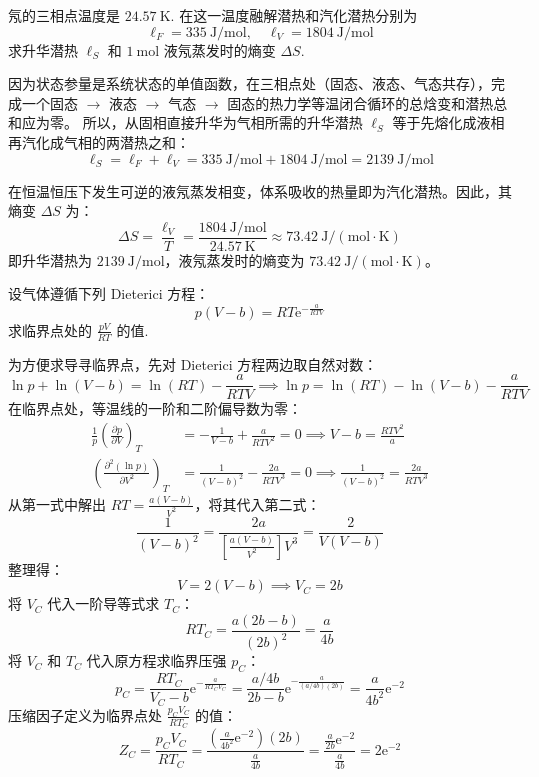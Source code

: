 \begin{exercise}\label{ex:14.4}
氖的三相点温度是 $24.57 \ \mathrm{K}$. 在这一温度融解潜热和汽化潜热分别为
$$ \ell_F = 335 \ \mathrm{J/mol}, \quad \ell_V = 1804 \ \mathrm{J/mol} $$
求升华潜热 $\ell_S$ 和 $1 \ \mathrm{mol}$ 液氖蒸发时的熵变 $\Delta S$.
\end{exercise}
\begin{solution}
因为状态参量是系统状态的单值函数，在三相点处（固态、液态、气态共存），完成一个固态 $\to$ 液态 $\to$ 气态 $\to$ 固态的热力学等温闭合循环的总焓变和潜热总和应为零。
所以，从固相直接升华为气相所需的升华潜热 $\ell_S$ 等于先熔化成液相再汽化成气相的两潜热之和：
$$ \ell_S = \ell_F + \ell_V = 335 \ \mathrm{J/mol} + 1804 \ \mathrm{J/mol} = 2139 \ \mathrm{J/mol} $$

在恒温恒压下发生可逆的液氖蒸发相变，体系吸收的热量即为汽化潜热。因此，其熵变 $\Delta S$ 为：
$$ \Delta S = \frac{\ell_V}{T} = \frac{1804 \ \mathrm{J/mol}}{24.57 \ \mathrm{K}} \approx 73.42 \ \mathrm{J/(mol \cdot K)} $$
即升华潜热为 $2139 \ \mathrm{J/mol}$，液氖蒸发时的熵变为 $73.42 \ \mathrm{J/(mol \cdot K)}$。
\end{solution}

\begin{exercise}\label{ex:14.5}
设气体遵循下列 Dieterici 方程：
$$ p(V-b) = RT\mathrm{e}^{-\frac{a}{RTV}} $$
求临界点处的 $\frac{pV}{RT}$ 的值.
\end{exercise}
\begin{solution}
为方便求导寻临界点，先对 Dieterici 方程两边取自然对数：
$$ \ln p + \ln(V - b) = \ln(RT) - \frac{a}{RTV} \implies \ln p = \ln(RT) - \ln(V - b) - \frac{a}{RTV} $$
在临界点处，等温线的一阶和二阶偏导数为零：
\begin{align*}
    \frac{1}{p} \left( \frac{\partial p}{\partial V} \right)_T &= - \frac{1}{V - b} + \frac{a}{RTV^2} = 0 \implies V - b = \frac{RTV^2}{a} \\
    \left( \frac{\partial^2 (\ln p)}{\partial V^2} \right)_T &= \frac{1}{(V - b)^2} - \frac{2a}{RTV^3} = 0 \implies \frac{1}{(V - b)^2} = \frac{2a}{RTV^3}
\end{align*}
从第一式中解出 $RT = \frac{a(V - b)}{V^2}$，将其代入第二式：
$$ \frac{1}{(V - b)^2} = \frac{2a}{\left[ \frac{a(V - b)}{V^2} \right] V^3} = \frac{2}{V(V - b)} $$
整理得：
$$ V = 2(V - b) \implies V_C = 2b $$
将 $V_C$ 代入一阶导等式求 $T_C$：
$$ RT_C = \frac{a(2b - b)}{(2b)^2} = \frac{a}{4b} $$
将 $V_C$ 和 $T_C$ 代入原方程求临界压强 $p_C$：
$$ p_C = \frac{RT_C}{V_C - b} \mathrm{e}^{-\frac{a}{RT_C V_C}} = \frac{a / 4b}{2b - b} \mathrm{e}^{-\frac{a}{(a/4b)(2b)}} = \frac{a}{4b^2} \mathrm{e}^{-2} $$
压缩因子定义为临界点处 $\frac{p_C V_C}{R T_C}$ 的值：
$$ Z_C = \frac{p_C V_C}{R T_C} = \frac{\left( \frac{a}{4b^2} \mathrm{e}^{-2} \right) (2b)}{\frac{a}{4b}} = \frac{\frac{a}{2b} \mathrm{e}^{-2}}{\frac{a}{4b}} = 2\mathrm{e}^{-2} $$
\end{solution}

